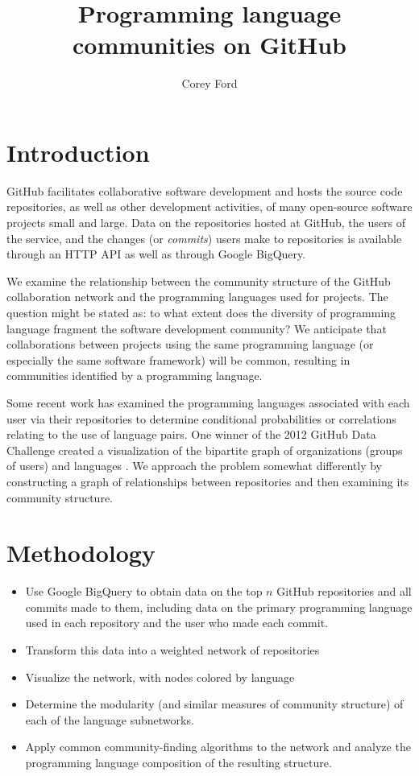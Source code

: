 \documentclass[twocolumn]{article}
\title{Programming language communities on GitHub}
\author{Corey Ford}
\begin{document}
\maketitle

\section*{Introduction}

GitHub \cite{github} facilitates collaborative software development and hosts
the source code repositories, as well as other development activities, of many
open-source software projects small and large. Data on the repositories hosted
at GitHub, the users of the service, and the changes (or \textit{commits}) users
make to repositories is available through an HTTP API as well as through Google
BigQuery.

We examine the relationship between the community structure of the GitHub
collaboration network and the programming languages used for projects. The
question might be stated as: to what extent does the diversity of programming
language fragment the software development community? We anticipate that
collaborations between projects using the same programming language (or
especially the same software framework) will be common, resulting in communities
identified by a programming language.

Some recent work has examined the programming languages associated with each
user via their repositories to determine conditional probabilities \cite{doll12}
or correlations \cite{shah13} relating to the use of language pairs. One winner
of the 2012 GitHub Data Challenge created a visualization of the bipartite graph
of organizations (groups of users) and languages \cite{rodrigues12}. We approach
the problem somewhat differently by constructing a graph of relationships
between repositories and then examining its community structure.

\section*{Methodology}
\begin{itemize}
    \item Use Google BigQuery to obtain data on the top $n$ GitHub repositories
        and all commits made to them, including data on the primary programming
        language used in each repository and the user who made each commit.
    \item Transform this data into a weighted network of repositories
    \item Visualize the network, with nodes colored by language
    \item Determine the modularity (and similar measures of community structure)
        of each of the language subnetworks.
    \item Apply common community-finding algorithms to the network and analyze
        the programming language composition of the resulting structure.
\end{itemize}
\end{document}
